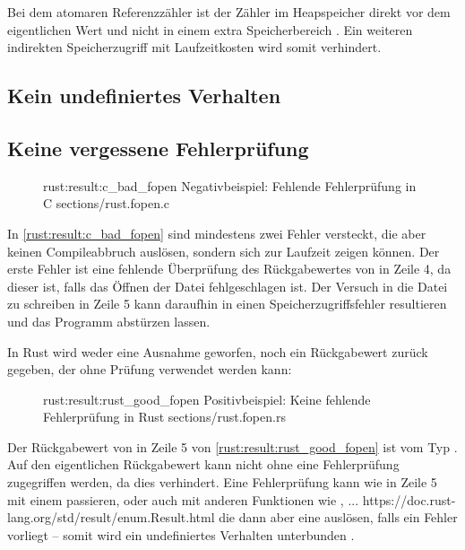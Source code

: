 Bei dem atomaren Referenzzähler  ist der Zähler im Heapspeicher direkt vor dem eigentlichen Wert und nicht in einem extra Speicherbereich .
Ein weiteren indirekten Speicherzugriff mit Laufzeitkosten wird somit verhindert.


\subsection{Kein undefiniertes Verhalten}
\label{rust:no_unitialized_usage}

\subsection{Keine vergessene Fehlerprüfung}
\label{rust:result}

\begin{figure}[H]
	\ccinclude
	{rust:result:c_bad_fopen}
	{Negativbeispiel: Fehlende Fehlerprüfung in C}
	{sections/rust.fopen.c}
\end{figure}

In \autoref{rust:result:c_bad_fopen} sind mindestens zwei Fehler versteckt, die aber keinen Compileabbruch auslösen, sondern sich zur Laufzeit zeigen können.
Der erste Fehler ist eine fehlende Überprüfung des Rückgabewertes von  in Zeile 4, da dieser  ist, falls das Öffnen der Datei fehlgeschlagen ist.
Der Versuch in die Datei zu schreiben in Zeile 5 kann daraufhin in einen Speicherzugriffsfehler resultieren und das Programm abstürzen lassen.

In Rust wird weder eine Ausnahme geworfen, noch ein Rückgabewert zurück gegeben, der ohne Prüfung verwendet werden kann:

\begin{figure}[H]
	\rustcinclude
		{rust:result:rust_good_fopen}
		{Positivbeispiel: Keine fehlende Fehlerprüfung in Rust}
		{sections/rust.fopen.rs}
\end{figure}

Der Rückgabewert von  in Zeile 5 von \autoref{rust:result:rust_good_fopen} ist vom Typ .
Auf den eigentlichen Rückgabewert  kann nicht ohne eine Fehlerprüfung zugegriffen werden, da dies  verhindert.
Eine Fehlerprüfung kann wie in Zeile 5 mit einem  passieren, oder auch mit anderen Funktionen wie ,  ... https://doc.rust-lang.org/std/result/enum.Result.html die dann aber eine   auslösen, falls ein Fehler vorliegt -- somit wird ein undefiniertes Verhalten unterbunden .


